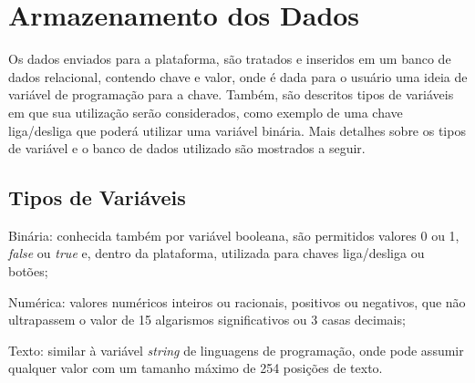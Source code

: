         \begin{figure}[!h]
    	\end{figure}

    \section{Armazenamento dos Dados}
    \label{sec:armazenamento-dados}
    
    Os dados enviados para a plataforma, são tratados e inseridos em um banco de dados relacional, contendo chave e valor, onde é dada para o usuário uma ideia de variável de programação para a chave. Também, são descritos tipos de variáveis em que sua utilização serão considerados, como exemplo de uma chave liga/desliga que poderá utilizar uma variável binária. Mais detalhes sobre os tipos de variável e o banco de dados utilizado são mostrados a seguir.
    
        \subsection{Tipos de Variáveis}
        \label{sec:tipos-variaveis}
            
        \begin{alineascomponto}
            \item Binária: conhecida também por variável booleana, são permitidos valores 0 ou 1, \textit{false} ou \textit{true} e, dentro da plataforma, utilizada para chaves liga/desliga ou botões;
            \item Numérica: valores numéricos inteiros ou racionais, positivos ou negativos, que não ultrapassem o valor de 15 algarismos significativos ou 3 casas decimais;
            \item Texto: similar à variável \textit{string} de linguagens de programação, onde pode assumir qualquer valor com um tamanho máximo de 254 posições de texto.
        \end{alineascomponto}
        
